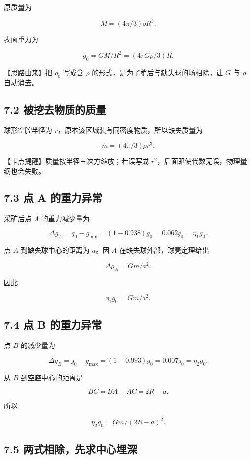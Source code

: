 \documentclass[
  11pt,
  UTF8]{ctexart}
\begin{document}
原质量为

\[M=(4π/3)ρR^3.\]

表面重力为

\[g_0=GM/R^2=(4πGρ/3)R.\]

【思路由来】把 \(g_0\) 写成含 \(ρ\)
的形式，是为了稍后与缺失球的场相除，让 \(G\) 与 \(ρ\) 自动消去。

\hypertarget{ux88abux6316ux53bbux7269ux8d28ux7684ux8d28ux91cf}{%
\subsection{7.2
被挖去物质的质量}\label{ux88abux6316ux53bbux7269ux8d28ux7684ux8d28ux91cf}}

球形空腔半径为 \(r\)，原本该区域装有同密度物质，所以缺失质量为

\[m=(4π/3)ρr^3.\]

【卡点提醒】质量按半径三次方缩放；若误写成
\(r^2\)，后面即使代数无误，物理量纲也会失败。

\hypertarget{ux70b9-a-ux7684ux91cdux529bux5f02ux5e38}{%
\subsection{7.3 点 A
的重力异常}\label{ux70b9-a-ux7684ux91cdux529bux5f02ux5e38}}

采矿后点 \(A\) 的重力减少量为

\[Δg_A=g_0-g_{\min}=(1-0.938)g_0=0.062g_0=η_1g_0.\]

点 \(A\) 到缺失球中心的距离为 \(a\)。因 \(A\) 在缺失球外部，球壳定理给出

\[Δg_A=Gm/a^2.\]

因此

\[η_1g_0=Gm/a^2. \tag{1}\]

\hypertarget{ux70b9-b-ux7684ux91cdux529bux5f02ux5e38}{%
\subsection{7.4 点 B
的重力异常}\label{ux70b9-b-ux7684ux91cdux529bux5f02ux5e38}}

点 \(B\) 的减少量为

\[Δg_B=g_0-g_{\max}=(1-0.993)g_0=0.007g_0=η_2g_0.\]

从 \(B\) 到空腔中心的距离是

\[BC=BA-AC=2R-a.\]

所以

\[η_2g_0=Gm/(2R-a)^2. \tag{2}\]

\hypertarget{ux4e24ux5f0fux76f8ux9664ux5148ux6c42ux4e2dux5fc3ux57cbux6df1}{%
\subsection{7.5
两式相除，先求中心埋深}\label{ux4e24ux5f0fux76f8ux9664ux5148ux6c42ux4e2dux5fc3ux57cbux6df1}}
\end{document}
